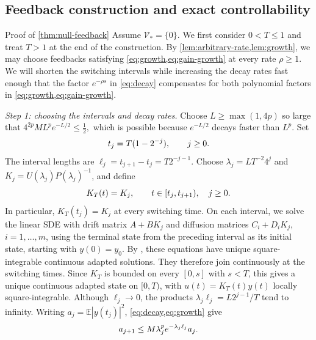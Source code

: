 \documentclass[twocolumn]{autart}
\newcounter{part}
\begin{document}
\subsection{Feedback construction and exact controllability}
\label{sec:switching}

\vspace{-3mm} 

\begin{pf*}{Proof of \cref{thm:null-feedback}}
Assume $\mathcal V_*=\{0\}$. We first consider $0<T\leq1$ and treat
$T>1$ at the end of the construction. By
\cref{lem:arbitrary-rate,lem:growth}, we may choose feedbacks satisfying
\cref{eq:growth,eq:gain-growth} at every rate $\rho\geq1$. We will
shorten the switching intervals while increasing the decay rates fast
enough that the factor $e^{-\rho s}$ in \cref{eq:decay} compensates for
both polynomial factors in \cref{eq:growth,eq:gain-growth}.

\emph{Step 1: choosing the intervals and decay rates.}
Choose $L\geq\max(1,4p)$ so large that
$
4^{2p}ML^pe^{-L/2}\leq\frac12,
$
which is possible because $e^{-L/2}$ decays faster than $L^p$. Set\vspace{-2mm}
\begin{equation}\label{eq:switch}
t_j=T(1-2^{-j}),\qquad j\geq0.\vspace{-2mm}
\end{equation}
The interval lengths are $\ell_j=t_{j+1}-t_j=T2^{-j-1}$. Choose
$\lambda_j=LT^{-2}4^j$ and
$K_j=U(\lambda_j)P(\lambda_j)^{-1}$, and define\vspace{-2mm}
\begin{equation*}
K_T(t)=K_j,\qquad t\in[t_j,t_{j+1}),\quad j\geq0.\vspace{-2mm}
\end{equation*}
In particular, $K_T(t_j)=K_j$ at every switching time.
On each interval, we solve the linear SDE with drift matrix
$A+BK_j$ and diffusion matrices $C_i+D_iK_j$, $i=1,\dots,m$,
using the terminal state from the preceding interval as its
initial state, starting with $y(0)=y_0$.
By \cite[Theorem~3.2, p.~132]{Lue2021a}, these equations have
unique square-integrable continuous adapted solutions.
They therefore join continuously at the switching times.
Since $K_T$ is bounded on every $[0,s]$ with $s<T$, this gives
a unique continuous adapted state on $[0,T)$, with
$u(t)=K_T(t)y(t)$ locally square-integrable.
Although
$\ell_j\to0$, the products $\lambda_j\ell_j=L2^{j-1}/T$ tend to
infinity. Writing $a_j=\mathbb E|y(t_j)|^2$,
\cref{eq:decay,eq:growth} give\vspace{-2mm}
\begin{equation}\label{eq:state-step}
a_{j+1}\leq M\lambda_j^pe^{-\lambda_j\ell_j}a_j.\vspace{-2mm}
\end{equation}


\end{pf*}
\end{document}

